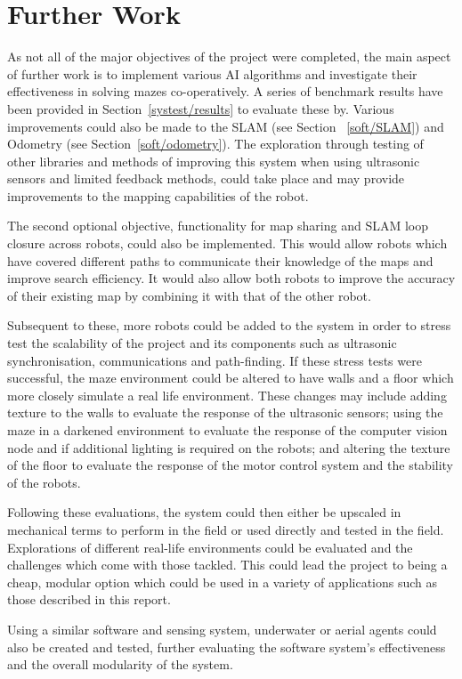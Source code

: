 
\chapter{Further Work}\label{furtherwork}
As not all of the major objectives of the project were completed, the main 
aspect of further work is to implement various AI algorithms and investigate 
their effectiveness in solving mazes co-operatively. A series of benchmark 
results have been provided in Section~\ref{systest/results} to evaluate 
these by. Various improvements could also be made to the SLAM (see Section~
\ref{soft/SLAM}) and Odometry (see Section~\ref{soft/odometry}). The exploration through testing of other 
libraries and methods of improving this system when using ultrasonic sensors 
and limited feedback methods, could take place and may provide improvements 
to the mapping capabilities of the robot. 

The second optional objective, functionality for map sharing and SLAM loop closure across robots, could also be implemented. This would allow robots which have covered different paths to communicate their knowledge of the maps and improve search efficiency. It would also allow both robots to improve the accuracy of their existing map by combining it with that of the other robot. 

Subsequent to these, more robots could be added to the system in order to 
stress test the scalability of the 
project and its components such as ultrasonic synchronisation, 
communications and path-finding. If these stress tests were successful, 
the maze environment could be altered to have walls and a floor which more 
closely simulate a real life environment. These changes may include adding 
texture to the walls to evaluate the response of the ultrasonic sensors; 
using the maze in a darkened environment to evaluate the response of the 
computer vision node and if additional lighting is required on the robots; 
and altering the texture of the floor to evaluate the response of the motor 
control system and the stability of the robots. 

Following these evaluations, the system could then either be upscaled in 
mechanical terms to perform in the field or used directly and tested in the 
field. Explorations of different real-life environments could be evaluated 
and the challenges which come with those tackled. This could lead the 
project to being a cheap, modular option which could be used in a variety of 
applications such as those described in this report. 

Using a similar software and sensing system, underwater or aerial agents 
could also be created and tested, further evaluating the software system's 
effectiveness and the overall modularity of the system. 